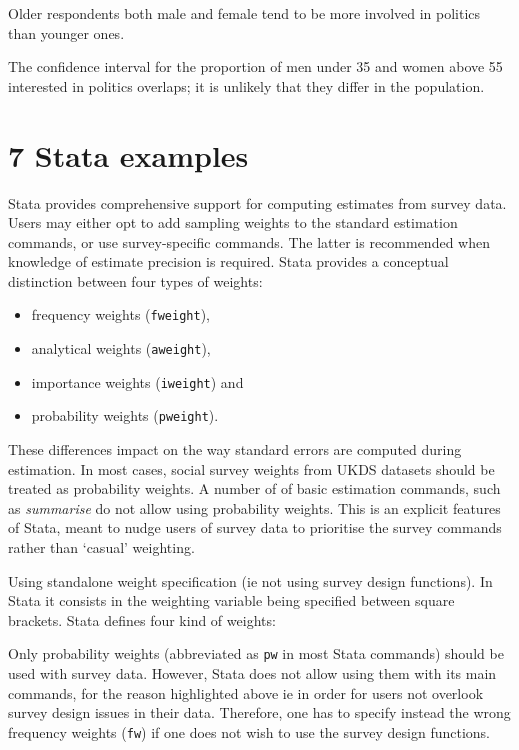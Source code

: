 \documentclass[
  14,
  a4paper,
  DIV=11,
  numbers=noendperiod]{scrartcl}
\providecommand{\tightlist}{%
  \setlength{\itemsep}{0pt}\setlength{\parskip}{0pt}}\usepackage{longtable,booktabs,array}
\begin{document}
Older respondents both male and female tend to be more involved in
politics than younger ones.

The confidence interval for the proportion of men under 35 and women
above 55 interested in politics overlaps; it is unlikely that they
differ in the population.

\hypertarget{stata-examples}{%
\section{7 Stata examples}\label{stata-examples}}

Stata provides comprehensive support for computing estimates from survey
data. Users may either opt to add sampling weights to the standard
estimation commands, or use survey-specific commands. The latter is
recommended when knowledge of estimate precision is required. Stata
provides a conceptual distinction between four types of weights:

\begin{itemize}
\tightlist
\item
  frequency weights (\texttt{fweight}),
\item
  analytical weights (\texttt{aweight}),
\item
  importance weights (\texttt{iweight}) and
\item
  probability weights (\texttt{pweight}).
\end{itemize}

These differences impact on the way standard errors are computed during
estimation. In most cases, social survey weights from UKDS datasets
should be treated as probability weights. A number of of basic
estimation commands, such as \emph{summarise} do not allow using
probability weights. This is an explicit features of Stata, meant to
nudge users of survey data to prioritise the survey commands rather than
`casual' weighting.

Using standalone weight specification (ie not using survey design
functions). In Stata it consists in the weighting variable being
specified between square brackets. Stata defines four kind of weights:

Only probability weights (abbreviated as \texttt{pw} in most Stata
commands) should be used with survey data. However, Stata does not allow
using them with its main commands, for the reason highlighted above ie
in order for users not overlook survey design issues in their data.
Therefore, one has to specify instead the wrong frequency weights
(\texttt{fw}) if one does not wish to use the survey design functions.
\end{document}
